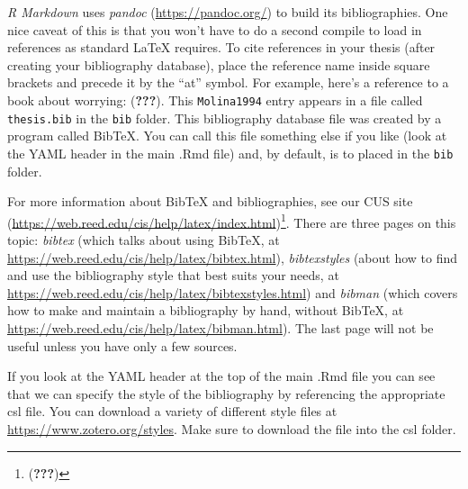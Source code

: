 \documentclass[12pt,twoside]{reedthesis}
\begin{document}
\emph{R Markdown} uses \emph{pandoc} (\url{https://pandoc.org/}) to build its bibliographies. One nice caveat of this is that you won't have to do a second compile to load in references as standard LaTeX requires. To cite references in your thesis (after creating your bibliography database), place the reference name inside square brackets and precede it by the ``at'' symbol. For example, here's a reference to a book about worrying: ({\textbf{???}}). This \texttt{Molina1994} entry appears in a file called \texttt{thesis.bib} in the \texttt{bib} folder. This bibliography database file was created by a program called BibTeX. You can call this file something else if you like (look at the YAML header in the main .Rmd file) and, by default, is to placed in the \texttt{bib} folder.

For more information about BibTeX and bibliographies, see our CUS site (\url{https://web.reed.edu/cis/help/latex/index.html})\footnote{({\textbf{???}})}. There are three pages on this topic: \emph{bibtex} (which talks about using BibTeX, at \url{https://web.reed.edu/cis/help/latex/bibtex.html}), \emph{bibtexstyles} (about how to find and use the bibliography style that best suits your needs, at \url{https://web.reed.edu/cis/help/latex/bibtexstyles.html}) and \emph{bibman} (which covers how to make and maintain a bibliography by hand, without BibTeX, at \url{https://web.reed.edu/cis/help/latex/bibman.html}). The last page will not be useful unless you have only a few sources.

If you look at the YAML header at the top of the main .Rmd file you can see that we can specify the style of the bibliography by referencing the appropriate csl file. You can download a variety of different style files at \url{https://www.zotero.org/styles}. Make sure to download the file into the csl folder.

\vfill
\end{document}
